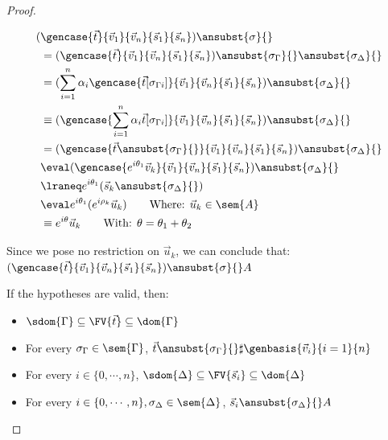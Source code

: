\begin{proof}
\begin{description}
    \begin{align*}
        (&\gencase{\vec{t}}{\vec{v}_{1}}{\vec{v}_{n}}{\vec{s}_{1}}{\vec{s}_{n}})\ansubst{\sigma}{}\\ 
        &= (\gencase{\vec{t}}{\vec{v}_{1}}{\vec{v}_{n}}{\vec{s}_{1}}{\vec{s}_{n}})\ansubst{\sigma_\Gamma}{}\ansubst{\sigma_\Delta}{}\\
        &= (\sum_{i=1}^{n}\alpha_i \gencase{\vec{t}[\sigma_{\Gamma i}]}{\vec{v}_{1}}{\vec{v}_{n}}{\vec{s}_{1}}{\vec{s}_{n}})\ansubst{\sigma_\Delta}{} \\
        &\equiv (\gencase{\sum_{i=1}^{n} \alpha_i \vec{t}[\sigma_{\Gamma i}]}{\vec{v}_{1}}{\vec{v}_{n}}{\vec{s}_{1}}{\vec{s}_{n}})\ansubst{\sigma_\Delta}{}\\
        &=(\gencase{\vec{t}\ansubst{\sigma_\Gamma}{}}{\vec{v}_{1}}{\vec{v}_{n}}{\vec{s}_{1}}{\vec{s}_{n}})\ansubst{\sigma_\Delta}{}\\
        &\eval(\gencase{e^{i\theta_1}\vec{v}_{k}}{\vec{v}_{1}}{\vec{v}_{n}}{\vec{s}_{1}}{\vec{s}_{n}})\ansubst{\sigma_\Delta}{}\\
        &\lraneq e^{i\theta_1}(\vec{s}_{k}\ansubst{\sigma_\Delta}{})\\
        &\eval e^{i\theta_1}(e^{i\rho_k} \vec{u}_{k})\qquad\text{Where: }\vec{u}_{k}\in\sem{A}\\
        &\equiv e^{i\theta} \vec{u}_{k}\qquad\text{With: }\theta=\theta_1 +\theta_2
    \end{align*}
    
    Since we pose no restriction on $\vec{u}_k$, we can conclude that: $(\gencase{\vec{t}}{\vec{v}_{1}}{\vec{v}_{n}}{\vec{s}_{1}}{\vec{s}_{n}})\ansubst{\sigma}{}\real A$

    \item[UnitCase] If the hypotheses are valid, then:
    \begin{itemize}
        \item $\sdom{\Gamma}\subseteq \FV{\vec{t}}\subseteq \dom{\Gamma}$
        \item For every $\sigma_\Gamma\in\sem{\Gamma}$, $\vec{t}\ansubst{\sigma_\Gamma}{}\real\sharp\genbasis{\vec{v}_{i}}{i=1}{n}$
        \item For every $i\in\{0,\dotsb ,n\}$, $\sdom{\Delta}\subseteq \FV{\vec{s}_{i}}\subseteq \dom{\Delta}$
        \item For every $i\in\{0,\dotsb ,n\}, \sigma_\Delta\in\sem{\Delta}$, $\vec{s}_{i}\ansubst{\sigma_\Delta}{}\real A$
    \end{itemize}
    

\end{description}
\end{proof}
